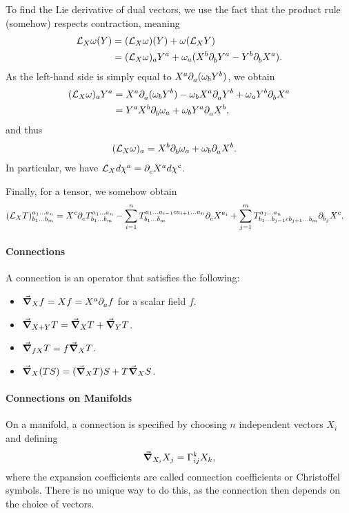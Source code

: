 To find the Lie derivative of dual vectors, we use the fact that the product rule (somehow) respects contraction, meaning
\begin{align*}
\mathcal{L}_{X}\omega(Y) &= (\mathcal{L}_{X}\omega)(Y) + \omega(\mathcal{L}_{X}Y) \\
&= (\mathcal{L}_{X}\omega)_{a}Y^{a} + \omega_{a}(X^{b}\partial^{}_{b}Y^{a} - Y^{b}\partial^{}_{b}X^{a}).
\end{align*}
As the left-hand side is simply equal to $X^{a}\partial^{}_{a}(\omega_{b}Y^{b})$, we obtain
\begin{align*}
(\mathcal{L}_{X}\omega)_{a}Y^{a} &= X^{a}\partial^{}_{a}(\omega_{b}Y^{b}) - \omega_{b}X^{a}\partial^{}_{a}Y^{b} + \omega_{a}Y^{b}\partial^{}_{b}X^{a} \\
&= Y^{a}X^{b}\partial^{}_{b}\omega_{a} + \omega_{b}Y^{a}\partial^{}_{a}X^{b},
\end{align*}
and thus
\begin{align*}
(\mathcal{L}_{X}\omega)_{a} &= X^{b}\partial^{}_{b}\omega_{a} + \omega_{b}\partial^{}_{a}X^{b}.
\end{align*}
In particular, we have $\mathcal{L}_{X}d\chi^{a} = \partial^{}_{c}X^{a}d\chi^{c}$.

Finally, for a tensor, we somehow obtain
\begin{align*}
\tensor*{(\lied{X}{T})}{^{a_{1}\dots a_{n}}_{b_{1}\dots b_{m}}} &= X^{c}\del{c}{\tensor*{T}{^{a_{1}\dots a_{n}}_{b_{1}\dots b_{m}}}} - \sum\limits_{i = 1}^{n}\tensor*{T}{^{a_{1}\dots a_{i - 1}ca_{i + 1}\dots a_{n}}_{b_{1}\dots b_{m}}}\del{c}{X^{a_{i}}} + \sum\limits_{j = 1}^{m}\tensor*{T}{^{a_{1}\dots a_{n}}_{b_{1}\dots b_{j - 1}cb_{j + 1}\dots b_{m}}}\del{b_{j}}{X^{c}}.
\end{align*}

\paragraph{Connections}
A connection is an operator that satisfies the following:
\begin{itemize}
	\item $\grad_{X}{f} = Xf = X^{a}\partial^{}_{a}f$ for a scalar field $f$.
	\item $\grad_{X + Y}{T} = \grad_{X}{T} + \grad_{Y}{T}$.
	\item $\grad_{fX}{T} = f\grad_{X}{T}$.
	\item $\grad_{X}{(TS)} = (\grad_{X}{T})S + T\grad_{X}{S}$.
\end{itemize}

\paragraph{Connections on Manifolds}
On a manifold, a connection is specified by choosing $n$ independent vectors $X_{i}$ and defining
\begin{align*}
\dcov{X_{i}}{X_{j}} = \chris{k}{i}{j}X_{k},
\end{align*}
where the expansion coefficients are called connection coefficients or Christoffel symbols. There is no unique way to do this, as the connection then depends on the choice of vectors.

